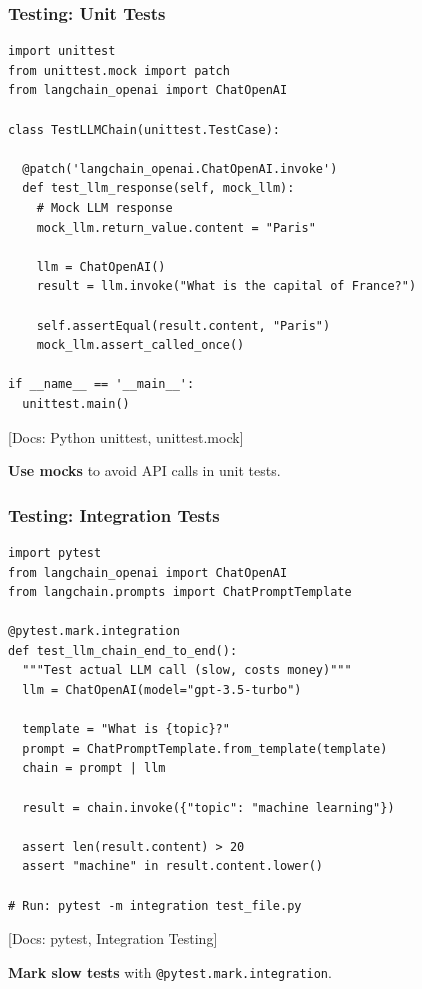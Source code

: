 \documentclass[aspectratio=169,11pt]{beamer}
\newcommand{\docref}[1]{{\scriptsize\color{docgray}[Docs: #1]}}
\begin{document}
\begin{frame}[fragile]
\frametitle{Testing: Unit Tests}
\vspace{-0.3cm}

\begin{lstlisting}
import unittest
from unittest.mock import patch
from langchain_openai import ChatOpenAI

class TestLLMChain(unittest.TestCase):

  @patch('langchain_openai.ChatOpenAI.invoke')
  def test_llm_response(self, mock_llm):
    # Mock LLM response
    mock_llm.return_value.content = "Paris"

    llm = ChatOpenAI()
    result = llm.invoke("What is the capital of France?")

    self.assertEqual(result.content, "Paris")
    mock_llm.assert_called_once()

if __name__ == '__main__':
  unittest.main()
\end{lstlisting}

\docref{Python unittest, unittest.mock}

\textbf{Use mocks} to avoid API calls in unit tests.

\end{frame}

\begin{frame}[fragile]
\frametitle{Testing: Integration Tests}

\begin{lstlisting}
import pytest
from langchain_openai import ChatOpenAI
from langchain.prompts import ChatPromptTemplate

@pytest.mark.integration
def test_llm_chain_end_to_end():
  """Test actual LLM call (slow, costs money)"""
  llm = ChatOpenAI(model="gpt-3.5-turbo")

  template = "What is {topic}?"
  prompt = ChatPromptTemplate.from_template(template)
  chain = prompt | llm

  result = chain.invoke({"topic": "machine learning"})

  assert len(result.content) > 20
  assert "machine" in result.content.lower()

# Run: pytest -m integration test_file.py
\end{lstlisting}

\docref{pytest, Integration Testing}

\small\textbf{Mark slow tests} with \texttt{@pytest.mark.integration}.

\end{frame}
\end{document}

